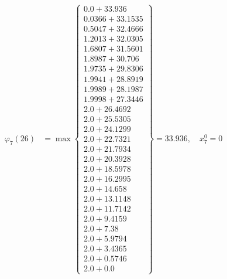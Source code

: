 \documentclass{article}
\begin{document}
\begin{align*}
  
\varphi_{7}(26) &= \max \left\{ \begin{array}{c}
0.0 + 33.936 \\
 0.0366 + 33.1535 \\
 0.5047 + 32.4666 \\
 1.2013 + 32.0305 \\
 1.6807 + 31.5601 \\
 1.8987 + 30.706 \\
 1.9735 + 29.8306 \\
 1.9941 + 28.8919 \\
 1.9989 + 28.1987 \\
 1.9998 + 27.3446 \\
 2.0 + 26.4692 \\
 2.0 + 25.5305 \\
 2.0 + 24.1299 \\
 2.0 + 22.7321 \\
 2.0 + 21.7934 \\
 2.0 + 20.3928 \\
 2.0 + 18.5978 \\
 2.0 + 16.2995 \\
 2.0 + 14.658 \\
 2.0 + 13.1148 \\
 2.0 + 11.7142 \\
 2.0 + 9.4159 \\
 2.0 + 7.38 \\
 2.0 + 5.9794 \\
 2.0 + 3.4365 \\
 2.0 + 0.5746 \\
 2.0 + 0.0
\end{array} \right\}=33.936,\quad x_{7}^0=0\\
  
  
  

\end{align*}
\end{document}
